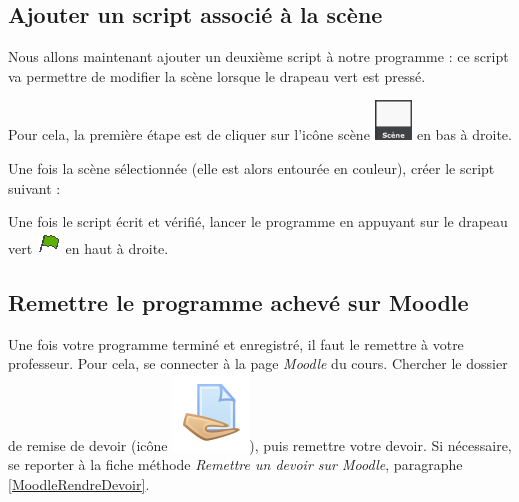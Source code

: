 \subsection{Ajouter un script associé à la scène}

Nous allons maintenant ajouter un deuxième script à notre programme : ce script va permettre de modifier la scène lorsque le drapeau vert est pressé. 

Pour cela, la première étape est de cliquer sur l'icône scène \includegraphics[width=1cm]{./images/scratch/Scene} en bas à droite.


Une fois la scène sélectionnée (elle est alors entourée en couleur), créer le script suivant :


Une fois le script écrit et vérifié, lancer le programme en appuyant sur le drapeau vert \includegraphics[width=.7cm]{./images/scratch/DrapeauVert} en haut à droite. 




\subsection{Remettre le programme achevé sur Moodle}

Une fois votre programme terminé et enregistré, il faut le remettre à votre professeur. Pour cela, se connecter à la page \emph{Moodle} du cours. Chercher le dossier de remise de devoir (icône \includegraphics[width=.04\textwidth]{./images/methode/MoodleDevoirIcone1}), puis remettre votre devoir. Si nécessaire, se reporter à la fiche méthode \emph{Remettre un devoir sur Moodle}, paragraphe \vref{MoodleRendreDevoir}.



%
%
%
%









